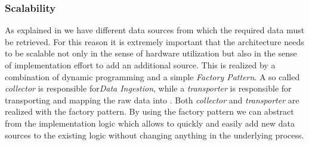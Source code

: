 \subsubsection{Scalability}
\label{subsubsec:scale}
As explained in  we have different data sources from which the required data must be retrieved.
For this reason it is extremely important that the architecture needs to be scalable not only in the sense of hardware utilization but also in the sense of implementation effort to add an additional source.
\newline
This is realized by a combination of dynamic programming and a simple \textit{Factory Pattern}\cite{GoF}.
\newline
A so called \textit{collector} is responsible for\textit{Data Ingestion}, while a \textit{transporter} is responsible for transporting and mapping the raw data into \pg{}.
Both \textit{collector} and \textit{transporter} are realized with the factory pattern.
By using the factory pattern we can abstract from the implementation logic which allows to quickly and easily add new data sources to the existing logic without changing anything in the underlying process.
%
